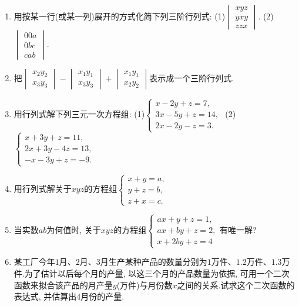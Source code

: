 \documentclass[10pt,a4paper]{article}
\begin{document}
\begin{enumerate}[1.]
\item 用按某一行(或某一列)展开的方式化简下列三阶行列式:
(1)$\begin{vmatrix}
    x  y  z  \\y  x  y  \\z  z  x  \end{vmatrix}$. (2)$\begin{vmatrix}
    0  0  a  \\0  b  c  \\c  a  b  \end{vmatrix}$.
\item 把$\begin{vmatrix}
    x_2  y_2  \\x_3  y_3  \end{vmatrix}-\begin{vmatrix}
    x_1  y_1  \\x_3  y_3  \end{vmatrix}+\begin{vmatrix}
    x_1  y_1  \\x_2  y_2  \end{vmatrix}$表示成一个三阶行列式.
\item 用行列式解下列三元一次方程组:
(1)$\begin{cases}
    x-2y+z=7,  \\3x-5y+z=14,  \\2x-2y-z=3.  \end{cases}$ (2)$\begin{cases}
    x+3y+z=11,  \\2x+3y-4z=13,  \\-x-3y+z=-9.  \end{cases}$
\item 用行列式解关于$xyz$的方程组$\begin{cases}
    x+y=a,  \\y+z=b,  \\z+x=c.  \end{cases}$
\item 当实数$ab$为何值时, 关于$xyz$的方程组$\begin{cases}
    ax+y+z=1,  \\ax+by+z=2,  \\x+2by+z=4  \end{cases}$有唯一解?
\item 某工厂今年$1$月、$2$月、$3$月生产某种产品的数量分别为$1$万件、$1.2$万件、$1.3$万件.为了估计以后每个月的产量, 以这三个月的产品数量为依据, 可用一个二次函数来拟合该产品的月产量$y$(万件)与月份数$x$之间的关系.试求这个二次函数的表达式, 并估算出$4$月份的产量.

\end{enumerate}
\end{document}
